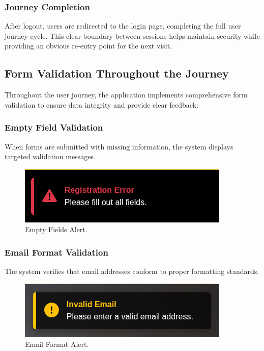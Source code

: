\subsubsection{Journey Completion} After logout, users are redirected to the login page, completing the full user journey cycle. This clear boundary between sessions helps maintain security while providing an obvious re-entry point for the next visit.

\subsection{Form Validation Throughout the Journey}

Throughout the user journey, the application implements comprehensive form validation to ensure data integrity and provide clear feedback:

\subsubsection{Empty Field Validation} When forms are submitted with missing information, the system displays targeted validation messages.

\begin{figure}[H]
    \centering
    \includegraphics[width=0.65\linewidth]{Figures/images/new_images/ErrorFillOutAllTheFields.png}
    \caption{Empty Fields Alert.} %
    \label{fig:error-empty-fields-journey}
\end{figure}

\subsubsection{Email Format Validation} The system verifies that email addresses conform to proper formatting standards.

\begin{figure}[H]
    \centering
    \includegraphics[width=0.65\linewidth]{Figures/images/new_images/ErrorEmail.png}
    \caption{Email Format Alert.} %
    \label{fig:error-email-journey}
\end{figure}

